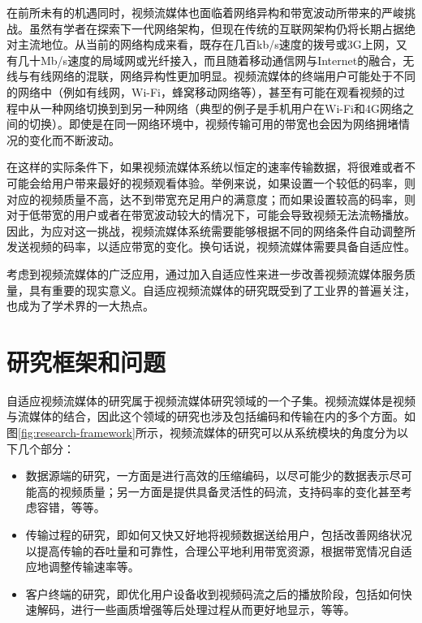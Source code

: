 在前所未有的机遇同时，视频流媒体也面临着网络异构和带宽波动所带来的严峻挑战。虽然有学者在探索下一代网络架构\supercite{Egilmez2014,Li2014,Xue2015}，但现在传统的互联网架构仍将长期占据绝对主流地位。从当前的网络构成来看，既存在几百kb/s速度的拨号或3G上网，又有几十Mb/s速度的局域网或光纤接入，而且随着移动通信网与Internet的融合，无线与有线网络的混联，网络异构性更加明显。视频流媒体的终端用户可能处于不同的网络中（例如有线网，Wi-Fi，蜂窝移动网络等），甚至有可能在观看视频的过程中从一种网络切换到到另一种网络（典型的例子是手机用户在Wi-Fi和4G网络之间的切换）。即使是在同一网络环境中，视频传输可用的带宽也会因为网络拥堵情况的变化而不断波动。

在这样的实际条件下，如果视频流媒体系统以恒定的速率传输数据，将很难或者不可能会给用户带来最好的视频观看体验。举例来说，如果设置一个较低的码率，则对应的视频质量不高，达不到带宽充足用户的满意度；而如果设置较高的码率，则对于低带宽的用户或者在带宽波动较大的情况下，可能会导致视频无法流畅播放。因此，为应对这一挑战，视频流媒体系统需要能够根据不同的网络条件自动调整所发送视频的码率，以适应带宽的变化。换句话说，视频流媒体需要具备自适应性。

考虑到视频流媒体的广泛应用，通过加入自适应性来进一步改善视频流媒体服务质量，具有重要的现实意义。自适应视频流媒体的研究既受到了工业界的普遍关注，也成为了学术界的一大热点。

\section{研究框架和问题}

自适应视频流媒体的研究属于视频流媒体研究领域的一个子集。视频流媒体是视频与流媒体的结合，因此这个领域的研究也涉及包括编码和传输在内的多个方面。如图\ref{fig:research-framework}所示，视频流媒体的研究可以从系统模块的角度分为以下几个部分：

\begin{itemize}
	\item 数据源端的研究，一方面是进行高效的压缩编码，以尽可能少的数据表示尽可能高的视频质量；另一方面是提供具备灵活性的码流，支持码率的变化甚至考虑容错，等等。
	\item 传输过程的研究，即如何又快又好地将视频数据送给用户，包括改善网络状况以提高传输的吞吐量和可靠性，合理公平地利用带宽资源，根据带宽情况自适应地调整传输速率等。
	\item 客户终端的研究，即优化用户设备收到视频码流之后的播放阶段，包括如何快速解码，进行一些画质增强等后处理过程从而更好地显示，等等。
\end{itemize}

